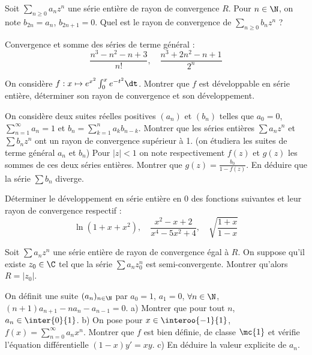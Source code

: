 \begin{exercice}
Soit $\sum_{n\ge 0}a_{n}z^{n}$ une série entière de rayon de convergence $R$. 
Pour $n\in\N$, on note $b_{2n}=a_{n}$, $b_{2n+1}=0$. 
Quel est le rayon de convergence de $\sum_{n\ge 0}b_{n}z^{n}$ ? 
\end{exercice}

\begin{exercice}
Convergence et somme des séries de terme général : 
$$ \frac{n^{3}-n^{2}-n+3}{n!}, \quad \frac{n^{3}+2n^{2}-n+1}{2^{n}} $$ 
\end{exercice}

\begin{exercice}
On considère $f:x\mapsto e^{x^{2}}\int_{0}^{x}e^{-t^{2}}\dt$. 
Montrer que $f$ est développable en série entière, déterminer son rayon de convergence et son développement. 
\end{exercice}

\begin{exercice}
On considère deux suites réelles positives $(a_{n})$ et $(b_{n})$ telles que $a_{0}=0$, $\sum_{n=1}^{\infty}a_{n}=1$ et $b_{n}=\sum_{k=1}^{n}a_{k}b_{n-k}$. 
Montrer que les séries entières $\sum a_{n}z^{n}$ et $\sum b_{n}z^{n}$ ont un rayon de convergence supérieur à 1. (on étudiera les suites de terme général $a_{n}$ et $b_{n}$) 
Pour $|z|<1$ on note respectivement $f(z)$ et $g(z)$ les sommes de ces deux séries entières. 
Montrer que $g(z)=\frac{b_{0}}{1-f(z)}$. 
En déduire que la série $\sum b_{n}$ diverge. 
\end{exercice}

\begin{exercice}
Déterminer le développement en série entière en 0 des fonctions suivantes et leur rayon de convergence respectif : 
$$ \ln(1+x+x^2), \quad \frac{x^2-x+2}{x^4-5x^2+4}, \quad \sqrt{\frac{1+x}{1-x}} $$ 
\end{exercice}

\begin{exercice}
Soit $\sum a_{n}z^{n}$ une série entière de rayon de convergence égal à $R$. 
On suppose qu'il existe $z_{0}\in\C$ tel que la série $\sum a_{n}z_{0}^{n}$ est semi-convergente. Montrer qu'alors $R=|z_{0}|$. 
\end{exercice}

\begin{exercice}
On définit une suite $(a_{n})_{n\in\N}$ par $a_{0}=1$, $a_{1}=0$, $\forall n\in\N$, $(n+1)a_{n+1}-na_{n}-a_{n-1}=0$. 
a) Montrer que pour tout $n$, $a_{n}\in\inter{0}{1}$. 
b) On pose pour $x\in\interoo{-1}{1}$, $f(x)=\sum_{n=0}^{\infty}a_{n}x^{n}$. 
Montrer que $f$ est bien définie, de classe $\mc{1}$ et vérifie l'équation différentielle $(1-x)y'=xy$. 
c) En déduire la valeur explicite de $a_{n}$. 
\end{exercice}

